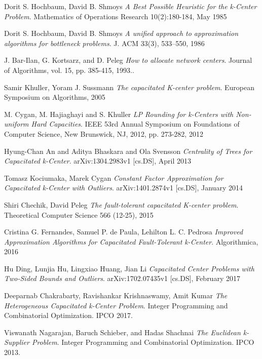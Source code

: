 \documentclass[12pt, a4paper]{article}
\begin{document}
\begin{thebibliography}{9}
Dorit S. Hochbaum, David B. Shmoys
\textit{A Best Possible Heuristic for the k-Center Problem}.
Mathematics of Operations Research 10(2):180-184, May 1985

Dorit S. Hochbaum, David B. Shmoys
\textit{A unified approach to approximation algorithms for bottleneck problems}.
 J. ACM 33(3), 533–550, 1986

J. Bar-Ilan, G. Kortsarz, and D. Peleg
\textit{How to allocate network centers}. 
Journal of Algorithms, vol. 15, pp. 385-415, 1993..

Samir Khuller, Yoram J. Sussmann
\textit{The capacitated K-center problem}.
European Symposium on Algorithms, 2005

M. Cygan, M. Hajiaghayi and S. Khuller
\textit{LP Rounding for k-Centers with Non-uniform Hard Capacities}.
IEEE 53rd Annual Symposium on Foundations of Computer Science, New Brunswick, NJ, 2012, pp. 273-282, 2012

Hyung-Chan An and Aditya Bhaskara and Ola Svensson
\textit{Centrality of Trees for Capacitated k-Center}.
arXiv:1304.2983v1 [cs.DS], April 2013

Tomasz Kociumaka, Marek Cygan
\textit{Constant Factor Approximation for Capacitated k-Center with Outliers}.
arXiv:1401.2874v1 [cs.DS], January 2014

Shiri Chechik, David Peleg
\textit{The fault-tolerant capacitated K-center problem}.
Theoretical Computer Science 566 (12-25),  2015

Cristina G. Fernandes, Samuel P. de Paula, Lehilton L. C. Pedrosa
\textit{Improved Approximation Algorithms for Capacitated Fault-Tolerant k-Center}.
Algorithmica, 2016

Hu Ding, Lunjia Hu, Lingxiao Huang, Jian Li
\textit{Capacitated Center Problems with Two-Sided Bounds and Outliers}.
arXiv:1702.07435v1 [cs.DS], February 2017

Deeparnab Chakrabarty, Ravishankar Krishnaswamy, Amit Kumar
\textit{The Heterogeneous Capacitated k-Center Problem}.
Integer Programming and Combinatorial Optimization. IPCO 2017.

Viswanath Nagarajan, Baruch Schieber, and Hadas Shachnai
\textit{The Euclidean k-Supplier Problem}.
Integer Programming and Combinatorial Optimization. IPCO 2013.
\end{thebibliography}
\end{document}

